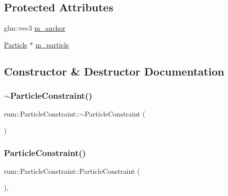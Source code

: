 \subsection*{Protected Attributes}
\begin{DoxyCompactItemize}
\item 
glm\+::vec3 \hyperlink{classrum_1_1_particle_constraint_a9822cd4e0be33424d7b3ffe0dce583a8}{m\+\_\+anchor}
\item 
\hyperlink{classrum_1_1_particle}{Particle} $\ast$ \hyperlink{classrum_1_1_particle_constraint_a78a37fb2e7d93ebdace6020a484ab35e}{m\+\_\+particle}
\end{DoxyCompactItemize}


\subsection{Constructor \& Destructor Documentation}
\mbox{\label{classrum_1_1_particle_constraint_a746b1856af604ddc7e0b763114b11d43}} 
\subsubsection{\texorpdfstring{$\sim$\+Particle\+Constraint()}{~ParticleConstraint()}}
{\footnotesize\ttfamily rum\+::\+Particle\+Constraint\+::$\sim$\+Particle\+Constraint (\begin{DoxyParamCaption}{ }\end{DoxyParamCaption})\hspace{0.3cm}{\ttfamily [virtual]}}

\mbox{\label{classrum_1_1_particle_constraint_aee5151f3813c45df9e65bf5ae29ba1d1}} 
\subsubsection{\texorpdfstring{Particle\+Constraint()}{ParticleConstraint()}}
{\footnotesize\ttfamily rum\+::\+Particle\+Constraint\+::\+Particle\+Constraint (\begin{DoxyParamCaption}{ }\end{DoxyParamCaption})\hspace{0.3cm}{\ttfamily [explicit]}, {\ttfamily [protected]}}



